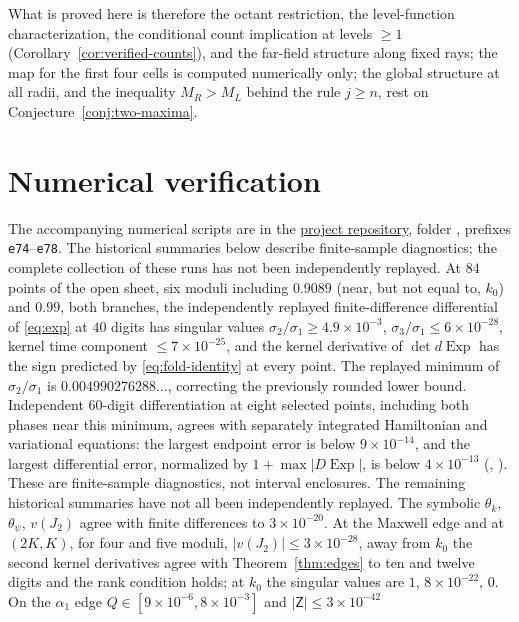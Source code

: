 \documentclass[11pt]{article}
\theoremstyle{remark}
\newcommand{\Exp}{\operatorname{Exp}}
\begin{document}
What is proved here is therefore the octant restriction, the
level-function characterization, the conditional count implication at
levels $\ge1$ (Corollary~\ref{cor:verified-counts}), and the far-field
structure along fixed rays; the map for the first four cells is computed
numerically only; the global structure at all radii, and the inequality
$M_R>M_L$ behind the rule $j\ge n$, rest on
Conjecture~\ref{conj:two-maxima}.

\section{Numerical verification}\label{sec:numerics}

The accompanying numerical scripts are in the
\href{https://github.com/moiseevigor/se2-conjugate-locus}{project repository}, folder
, prefixes \texttt{e74}--\texttt{e78}.
The historical summaries below describe finite-sample diagnostics;
the complete collection of these runs has not been independently
replayed.  At $84$ points of the open sheet, six moduli including
$0.9089$ (near, but not equal to, $k_0$) and $0.99$, both branches,
the independently replayed finite-difference
differential of \eqref{eq:exp} at $40$ digits has singular values
$\sigma_2/\sigma_1\ge4.9\times10^{-3}$, $\sigma_3/\sigma_1\le6\times10^{-28}$,
kernel time component $\le7\times10^{-25}$, and the kernel derivative of
$\det d\Exp$ has the sign predicted by \eqref{eq:fold-identity} at every
point.  The replayed minimum of $\sigma_2/\sigma_1$ is
$0.004990276288\ldots$, correcting the previously rounded lower bound.
Independent $60$-digit differentiation at eight selected points, including
both phases near this minimum, agrees with separately integrated
Hamiltonian and variational equations: the largest endpoint error is
below $9\times10^{-14}$, and the largest differential error, normalized
by $1+\max|D\Exp|$, is below $4\times10^{-13}$
(,
).
These are finite-sample diagnostics, not interval enclosures.
The remaining historical summaries have not all been independently
replayed.  The symbolic $\theta_k$, $\theta_\psi$, $v(J_2)$ agree with finite
differences to $3\times10^{-20}$.  At the Maxwell edge and at $(2K,K)$, for
four and five moduli, $|v(J_2)|\le3\times10^{-28}$, away from $k_0$ the second kernel derivatives agree
with Theorem~\ref{thm:edges} to ten and twelve digits and the rank condition
holds; at $k_0$ the singular values are $1$, $8\times10^{-22}$, $0$.
On the $\alpha_1$ edge $Q\in[9\times10^{-6},8\times10^{-3}]$ and $|\mathsf Z|\le3\times10^{-42}$
\end{document}
